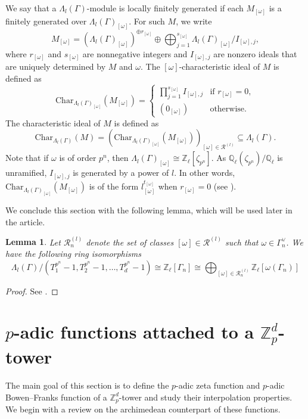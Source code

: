 \documentclass[11pt]{amsart}
\newtheorem{lemma}[theorem]{Lemma}
\numberwithin{equation}{section}
\theoremstyle{remark}
\newcommand{\?}{\stackrel{?}{=}}
\newcommand{\QQ}{\mathbb{Q}}
\newcommand{\ZZ}{\mathbb{Z}}
\newcommand{\Zp}{\mathbb{Z}_p}
\newcommand{\Char}{\mathrm{Char}}
\newcommand{\blue}[1]{\textcolor{blue}{#1}}
\newcommand{\DV}[1]{\textcolor{red}{#1}}
\newcommand{\sR}{\mathscr{R}}
\newcommand{\Zl}{\ZZ_\ell}
\newcommand{\Ql}{\QQ_\ell}
\begin{document}
We say that a $\Lambda_l(\Gamma)$-module is locally finitely generated if each $M_{[\omega]}$ is a finitely generated over $\Lambda_l(\Gamma)_{[\omega]}$.
For such $M$, we write
\[
M_{[\omega]}=\left(\Lambda_l(\Gamma)_{[\omega]}\right)^{\oplus r_{[\omega]}}\oplus\bigoplus_{j=1}^{s_{[\omega]}}\Lambda_l(\Gamma)_{[\omega]}/I_{[\omega],j},
\]
where $r_{[\omega]}$ and $s_{[\omega]}$ are nonnegative integers and $I_{[\omega],j}$ are nonzero ideals that are uniquely determined by $M$ and $\omega$.
The $[\omega]$-characteristic ideal of $M$ is defined as
\[
\Char_{\Lambda_l(\Gamma)_{[\omega]}}\left(M_{[\omega]}\right)=\begin{cases}
    \prod_{j=1}^{s_{[\omega]}}I_{[\omega],j}& \text{if }r_{[\omega]}=0,\\
    (0_{[\omega]})&\text{otherwise.}
\end{cases}
\]
The characteristic ideal of $M$ is defined as
\[
\Char_{\Lambda_l(\Gamma)}(M)=\left(\Char_{\Lambda_l(\Gamma)_{[\omega]}}\left(M_{[\omega]}\right)\right)_{[\omega]\in\sR^{(l)}}\subseteq\Lambda_l(\Gamma).
\]
Note that if $\omega$ is of order $p^n$, then $\Lambda_l(\Gamma)_{[\omega]}\cong\Zl[\zeta_{p^n}]$. As $\Ql(\zeta_{p^n})/\Ql$ is unramified, $I_{[\omega],j}$ is generated by a power of $l$. In other words, $\Char_{\Lambda_l(\Gamma)_{[\omega]}}(M_{[\omega]})$ is of the form $l_{[\omega]}^{t_{[\omega]}}$ when $r_{[\omega]}=0$ (see \cite[Remark~4.8]{BandiniLonghi}).


We conclude this section with the following lemma, which will be used later in the article.



\begin{lemma}
\label{isomorphism-group rings}
Let  $\sR_n^{(l)}$ denote the set of classes $[\omega]\in\sR^{(l)}$ such that $\omega\in\Gamma_n^\vee$.     We have the following ring isomorphisms
    \[\Lambda_l(\Gamma)/(T_1^{p^n}-1,T_2^{p^n}-1,\dots , T_d^{p^n}-1)\cong\Zl[\Gamma_n]\cong \bigoplus_{[\omega]\in\sR_n^{(l)}}\Zl[\omega(\Gamma_n)]  \]
   \end{lemma}
\begin{proof}
    See \cite[Remark 2.2 (4)]{BandiniLonghi}.
\end{proof}


\section{$p$-adic functions attached to a $\Zp^d$-tower}
The main goal of this section is to define the $p$-adic zeta function and $p$-adic Bowen--Franks function of a $\Zp^d$-tower and study their interpolation properties. We begin with a review on the archimedean counterpart of these functions.
\end{document}
